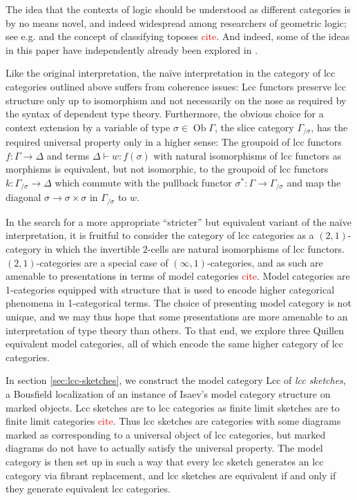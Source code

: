 \documentclass[a4paper]{article}
\newcommand{\todo}[1]{\textcolor{red}{#1}}
\theoremstyle{remark}
\theoremstyle{definition}
\begin{document}
The idea that the contexts of logic should be understood as different categories is by no means novel, and indeed widespread among researchers of geometric logic; see e.g. \cite[section 4.5]{locales-and-toposes-as-spaces} and the concept of classifying toposes \todo{cite}.
And indeed, some of the ideas in this paper have independently already been explored in \cite{au-sketches}.

Like the original interpretation, the naïve interpretation in the category of lcc categories outlined above suffers from coherence issues:
Lcc functors preserve lcc structure only up to isomorphism and not necessarily on the nose as required by the syntax of dependent type theory.
Furthermore, the obvious choice for a context extension by a variable of type $\sigma \in \operatorname{Ob} \Gamma$, the slice category $\Gamma_{/ \sigma}$, has the required universal property only in a higher sense:
The groupoid of lcc functors $f : \Gamma \rightarrow \Delta$ and terms $\Delta \vdash w : f(\sigma)$ with natural isomorphisms of lcc functors as morphisms is equivalent, but not isomorphic, to the groupoid of lcc functors $k : \Gamma_{/ \sigma} \rightarrow \Delta$ which commute with the pullback functor $\sigma^* : \Gamma \rightarrow \Gamma_{/ \sigma}$ and map the diagonal $\sigma \rightarrow \sigma \times \sigma$ in $\Gamma_{/ \sigma}$ to $w$.

In the search for a more appropriate ``stricter'' but equivalent variant of the naïve interpretation, it is fruitful to consider the category of lcc categories as a $(2, 1)$-category in which the invertible 2-cells are natural isomorphisms of lcc functors.
$(2, 1)$-categories are a special case of $(\infty, 1)$-categories, and as such are amenable to presentations in terms of model categories \todo{cite}.
Model categories are 1-categories equipped with structure that is used to encode higher categorical phenomena in 1-categorical terms.
The choice of presenting model category is not unique, and we may thus hope that some presentations are more amenable to an interpretation of type theory than others.
To that end, we explore three Quillen equivalent model categories, all of which encode the same higher category of lcc categories.

In section \ref{sec:lcc-sketches}, we construct the model category $\mathrm{Lcc}$ of \emph{lcc sketches}, a Bousfield localization of an instance of Isaev's model category structure on marked objects.
Lcc sketches are to lcc categories as finite limit sketches are to finite limit categories \todo{cite}.
Thus lcc sketches are categories with some diagrams marked as corresponding to a universal object of lcc categories, but marked diagrams do not have to actually satisfy the universal property.
The model category is then set up in such a way that every lcc sketch generates an lcc category via fibrant replacement, and lcc sketches are equivalent if and only if they generate equivalent lcc categories.
\end{document}
